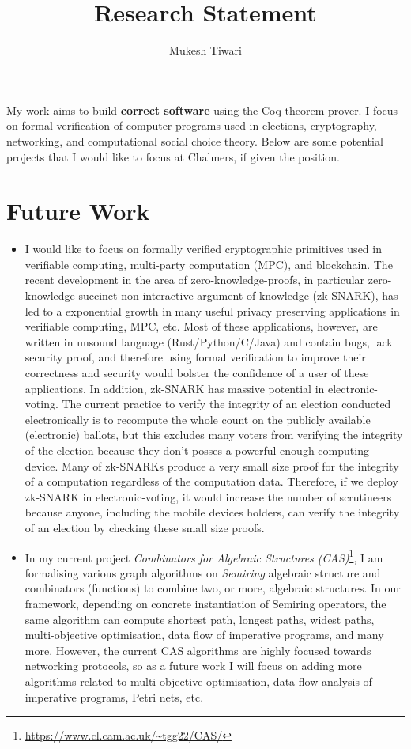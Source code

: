 \documentclass[a4paper]{article}
\title{Research Statement}
\author{Mukesh Tiwari}
\date{}
\begin{document}
\fontsize{11}{15}
\selectfont
\maketitle

My work aims to build \textbf{correct software} 
using the Coq theorem prover. 
I focus on formal verification of computer programs used in elections, cryptography, 
networking, and computational social choice theory. Below are some potential projects 
that I would like to focus at Chalmers, if given the position.


\section{Future Work}
\begin{itemize}
\item I would like to focus 
	on formally verified cryptographic primitives used in
	verifiable computing, multi-party computation (MPC), and blockchain.
	The recent development in the 
	area of zero-knowledge-proofs, in particular 
	zero-knowledge succinct non-interactive argument of knowledge (zk-SNARK), 
	has led to a exponential growth in many useful 
	privacy preserving applications in verifiable computing, MPC, etc. Most of these 
	applications, however, are written 
	in unsound language (Rust/Python/C/Java) and contain bugs,
	lack security proof, and therefore using formal verification 
	to improve their correctness and security would bolster the 
	confidence of a user of these applications.
	In addition, zk-SNARK has massive potential in electronic-voting. The current 
	practice to verify the integrity of an election conducted electronically is to 
	recompute the whole count on the publicly available (electronic) ballots, but 
	this excludes many voters from verifying the integrity of the election because 
	they don't posses a powerful enough computing device. Many of 
	zk-SNARKs produce a very small size proof for the integrity of a computation 
	regardless of the computation data. Therefore, if we deploy zk-SNARK in 
	electronic-voting, it would 
	increase the number of scrutineers because anyone, including the 
	mobile devices holders, can verify the integrity of an election 
	by checking these small size proofs. 

\item In my current project \emph{Combinators for Algebraic 
	Structures (CAS)}\footnote{\url{https://www.cl.cam.ac.uk/~tgg22/CAS/}}, 
	I am formalising various graph algorithms on \emph{Semiring} algebraic 
	structure and combinators (functions) to combine two, or more, algebraic structures.
	In our framework, depending on concrete instantiation of Semiring operators,
	the same algorithm can compute shortest path, longest paths, widest paths, 
	multi-objective optimisation, data flow of imperative programs, and many more.
	However, the current CAS algorithms are highly focused towards networking 
	protocols, so as a future work I will focus on adding more algorithms 
	related to multi-objective optimisation, data flow analysis of
	imperative programs, Petri nets, etc. 


\end{itemize}
\end{document}
